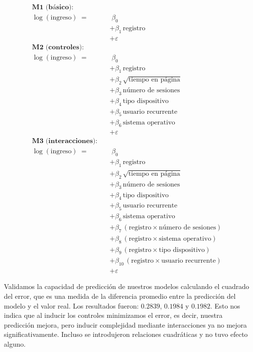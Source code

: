 \documentclass[conference]{IEEEtran}
\begin{document}
\begin{align*}
\textbf{M1 (básico):}\quad &\\
\log(\text{ingreso}) \;=\;& \; \beta_0 \nonumber \\
&+ \beta_1 \,\text{registro} \nonumber \\
&+ \varepsilon \\[1em]
%
\textbf{M2 (controles):}\quad &\\
\log(\text{ingreso}) \;=\;& \; \beta_0 \nonumber \\
&+ \beta_1 \,\text{registro} \nonumber \\
&+ \beta_2 \,\sqrt{\text{tiempo en página}} \nonumber \\
&+ \beta_3 \,\text{número de sesiones} \nonumber \\
&+ \beta_4 \,\text{tipo dispositivo} \nonumber \\
&+ \beta_5 \,\text{usuario recurrente} \nonumber \\
&+ \beta_6 \,\text{sistema operativo} \nonumber \\
&+ \varepsilon \\[1em]
%
\textbf{M3 (interacciones):}\quad &\\
\log(\text{ingreso}) \;=\;& \; \beta_0 \nonumber \\
&+ \beta_1 \,\text{registro} \nonumber \\
&+ \beta_2 \,\sqrt{\text{tiempo en página}} \nonumber \\
&+ \beta_3 \,\text{número de sesiones} \nonumber \\
&+ \beta_4 \,\text{tipo dispositivo} \nonumber \\
&+ \beta_5 \,\text{usuario recurrente} \nonumber \\
&+ \beta_6 \,\text{sistema operativo} \nonumber \\
&+ \beta_7 \,(\text{registro} \times \text{número de sesiones}) \nonumber \\
&+ \beta_8 \,(\text{registro} \times \text{sistema operativo}) \nonumber \\
&+ \beta_9 \,(\text{registro} \times \text{tipo dispositivo}) \nonumber \\
&+ \beta_{10} \,(\text{registro} \times \text{usuario recurrente}) \nonumber \\
&+ \varepsilon
\end{align*}

Validamos la capacidad de predicción de nuestros modelos calculando el cuadrado del error, 
que es una medida de la diferencia promedio entre la predicción del modelo y el valor real. 
Los resultados fueron: $0.2839$, $0.1984$ y $0.1982$. Esto nos indica que al inducir los controles minimizamos el error, es decir,
 nuestra predicción mejora, pero inducir complejidad mediante interacciones ya no mejora significativamente. 
 Incluso se introdujeron relaciones cuadráticas y no tuvo efecto alguno. 
\end{document}
